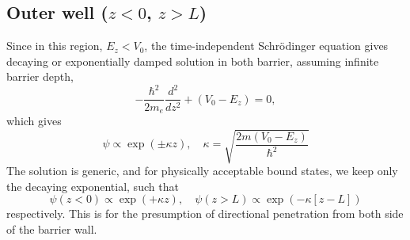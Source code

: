 \documentclass[%
 reprint,
 amsmath,amssymb,
 aps,
]{revtex4-2}
\begin{document}
\subsection{Outer well ($z<0$, $z>L$)}
Since in this region, $E_{z}<V_{0}$, the time-independent Schrödinger equation gives decaying or exponentially damped solution in both barrier, assuming infinite barrier depth, 
\begin{equation}
    -\frac{\hbar^2}{2m_e} \frac{d^2}{dz^2} + (V_{0}-E_{z}) = 0,
\end{equation}
which gives
\begin{equation}
    \psi \propto \exp{(\pm \kappa z)}, \quad \kappa = \sqrt{\dfrac{2m(V_{0}-E_{z})}{\hbar^2}}
\end{equation}
The solution is generic, and for physically acceptable bound states, we keep only the decaying exponential, such that
\begin{equation}
    \psi(z<0) \propto \exp{(+\kappa z)}, \quad \psi(z>L) \propto \exp{(-\kappa[z-L])}
\end{equation}
respectively. This is for the presumption of directional penetration from both side of the barrier wall. 
\end{document}
